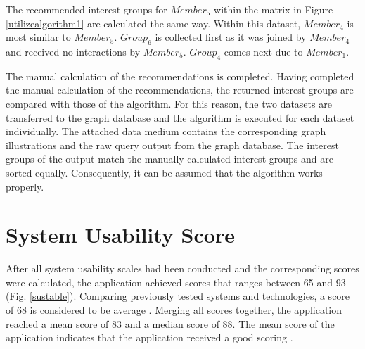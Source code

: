 \documentclass[12pt,numbers=noenddot,parskip,bibliography=totocnumbered,listof=totocnumbered,draft]{scrreprt}
\begin{document}
The recommended interest groups for $\mathit{Member}_5$ within the matrix in Figure \ref{utilizealgorithm1} are calculated the same way. Within this dataset, $\mathit{Member}_4$ is most similar to $\mathit{Member}_5$. $\mathit{Group}_6$ is collected first as it was joined by $\mathit{Member}_4$ and received no interactions by $\mathit{Member}_5$. $\mathit{Group}_4$ comes next due to $\mathit{Member}_1$.

The manual calculation of the recommendations is completed. Having completed the manual calculation of the recommendations, the returned interest groups are compared with those of the algorithm. For this reason, the two datasets are transferred to the graph database and the algorithm is executed for each dataset individually. The attached data medium contains the corresponding graph illustrations and the raw query output from the graph database. The interest groups of the output match the manually calculated interest groups and are sorted equally. Consequently, it can be assumed that the algorithm works properly.

\section{System Usability Score}
After all system usability scales had been conducted and the corresponding scores were calculated, the application achieved scores that ranges between 65 and 93 (Fig. \ref{sustable}). Comparing previously tested systems and technologies, a score of 68 is considered to be average \citep[p. 36]{brooke2013}. Merging all scores together, the application reached a mean score of 83 and a median score of 88. The mean score of the application indicates that the application received a good scoring \citep[p. 36]{brooke2013}.
\end{document}
